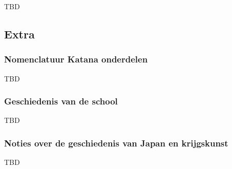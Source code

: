 TBD

\subsection{Extra}

\subsubsection{Nomenclatuur Katana onderdelen}

TBD

\subsubsection{Geschiedenis van de school}

TBD

\subsubsection{Noties over de geschiedenis van Japan en krijgskunst}

TBD
